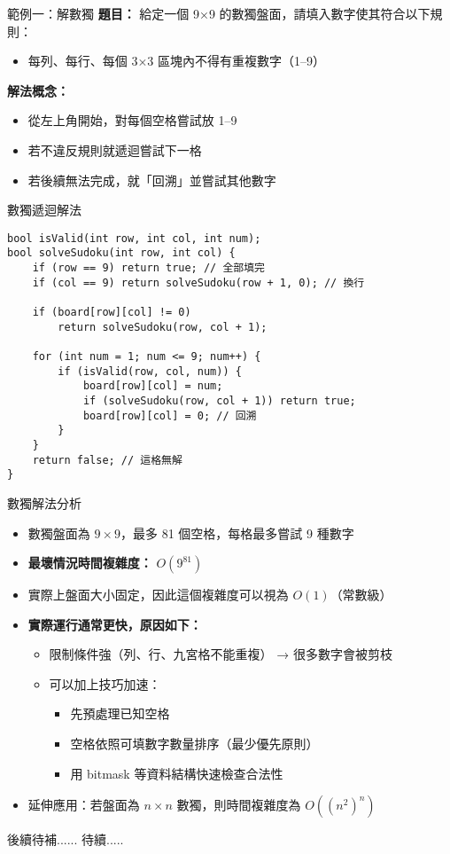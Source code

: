\documentclass{beamer}
\begin{document}
\begin{frame}{範例一：解數獨}
\textbf{題目：} 給定一個 9×9 的數獨盤面，請填入數字使其符合以下規則：
\begin{itemize}
    \item 每列、每行、每個 3×3 區塊內不得有重複數字（1–9）
\end{itemize}

\vspace{0.5em}
\textbf{解法概念：}
\begin{itemize}
    \item 從左上角開始，對每個空格嘗試放 1–9
    \item 若不違反規則就遞迴嘗試下一格
    \item 若後續無法完成，就「回溯」並嘗試其他數字
\end{itemize}
\end{frame}

\begin{frame}[fragile]{數獨遞迴解法}
\begin{lstlisting}[style=cppstyle]
bool isValid(int row, int col, int num);
bool solveSudoku(int row, int col) {
    if (row == 9) return true; // 全部填完
    if (col == 9) return solveSudoku(row + 1, 0); // 換行

    if (board[row][col] != 0)
        return solveSudoku(row, col + 1);

    for (int num = 1; num <= 9; num++) {
        if (isValid(row, col, num)) {
            board[row][col] = num;
            if (solveSudoku(row, col + 1)) return true;
            board[row][col] = 0; // 回溯
        }
    }
    return false; // 這格無解
}
\end{lstlisting}
\end{frame}

\begin{frame}{數獨解法分析}
\begin{itemize}
    \item 數獨盤面為 $9 \times 9$，最多 81 個空格，每格最多嘗試 9 種數字
    \item \textbf{最壞情況時間複雜度：} $O(9^{81})$
    \item 實際上盤面大小固定，因此這個複雜度可以視為 $O(1)$（常數級）
    \item \textbf{實際運行通常更快，原因如下：}
    \begin{itemize}
        \item 限制條件強（列、行、九宮格不能重複） → 很多數字會被剪枝
        \item 可以加上技巧加速：
        \begin{itemize}
            \item 先預處理已知空格
            \item 空格依照可填數字數量排序（最少優先原則）
            \item 用 bitmask 等資料結構快速檢查合法性
        \end{itemize}
    \end{itemize}
    \item 延伸應用：若盤面為 $n \times n$ 數獨，則時間複雜度為 $O( (n^2)^n )$
\end{itemize}
\end{frame}


\begin{frame}[fragile]{後續待補......}
待續.....
\end{frame}
\end{document}

